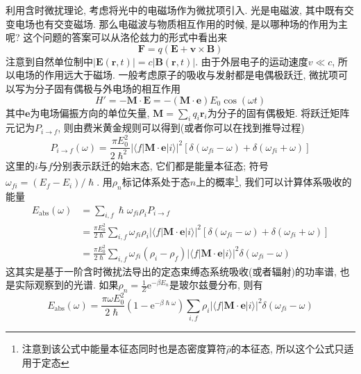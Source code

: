     利用含时微扰理论, 考虑将光中的电磁场作为微扰项引入. 
    光是电磁波, 其中既有交变电场也有交变磁场. 那么电磁波与物质相互作用的时候, 是以哪种场的作用为主呢? 
    这个问题的答案可以从洛伦兹力的形式中看出来
    \begin{equation}
        \bm{F} = q (\bm{E} + \bm{v} \times \bm{B})
    \end{equation}
    注意到自然单位制中$|\bm{E}(\bm r,t)| = c|\bm{B}(\bm r,t)|$. 由于外层电子的运动速度$v \ll c$, 所以电场的作用远大于磁场. 一般考虑原子的吸收与发射都是电偶极跃迁, 微扰项可以写为分子固有偶极与外电场的相互作用
    \begin{equation}
        H' = - \bm{M} \cdot \bm{E} = - (\bm{M} \cdot \bm{e}) E_0 \cos(\omega t)
    \end{equation}
    其中$\bm{e}$为电场偏振方向的单位矢量, $\bm{M} = \sum_i q_i \bm{r}_i$为分子的固有偶极矩. 将跃迁矩阵元记为$P_{i\to f}$, 则由费米黄金规则可以得到(或者你可以在\cite{蒋鸿中物化:含时微扰}找到推导过程)
    \begin{equation}
        P_{i\to f}(\omega) = \frac{\pi E_0^2}{2\hslash^2} \left| \langle f|\bm{M} \cdot \bm{e}|i \rangle \right|^2 \left[ \delta(\omega_{fi} - \omega) + \delta(\omega_{fi} + \omega) \right]
    \end{equation}
    这里的$i$与$f$分别表示跃迁的始末态, 它们都是能量本征态; 符号$\omega_{fi} = (E_f - E_i)/\hslash$. 用$\rho_n$标记体系处于态$n$上的概率\footnote{注意到该公式中能量本征态同时也是态密度算符$\hat\rho$的本征态, 所以这个公式只适用于定态}, 我们可以计算体系吸收的能量
    \begin{equation}\begin{aligned}
        E_\mathrm{abs}(\omega) 
        &= \sum_{i,f}  \hslash\omega_{fi} \rho_i P_{i\to f} \\
        &= \frac{\pi E_0^2}{2\hslash} \sum_{i,f} \omega_{fi} \rho_i \left| \langle f|\bm{M} \cdot \bm{e}|i \rangle \right|^2 \left[ \delta(\omega_{fi} - \omega) + \delta(\omega_{fi} + \omega) \right] \\
        &= \frac{\pi E_0^2}{2\hslash} \sum_{i,f} \omega_{fi} (\rho_i - \rho_f) \left| \langle f|\bm{M} \cdot \bm{e}|i \rangle \right|^2 \delta(\omega_{fi} - \omega)
    \end{aligned}\end{equation}
    这其实是基于一阶含时微扰法导出的定态束缚态系统吸收(或者辐射)的功率谱, 也是实际观察到的光谱. 如果$\rho_n = \frac 1Z \mathrm{e}^{-\beta E_n}$是玻尔兹曼分布, 则有
    \begin{equation}
        E_\mathrm{abs}(\omega) = \frac{\pi \omega E_0^2}{2\hslash} (1 - \mathrm{e}^{-\beta\hslash\omega}) \sum_{i,f} \rho_i \left| \langle f|\bm{M} \cdot \bm{e}|i \rangle \right|^2 \delta(\omega_{fi} - \omega)
    \end{equation}

